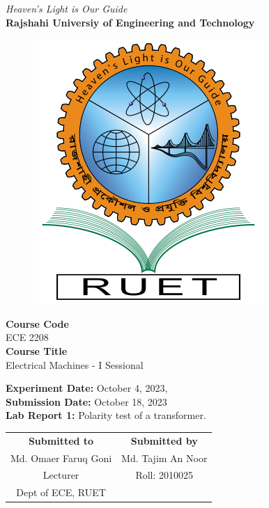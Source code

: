 \vspace*{\fill}
\begin{center}

    \emph{Heaven's Light is Our Guide} \\
    \textbf{Rajshahi Universiy of Engineering and Technology} \\

    \begin{figure}[h]
        \centering
        \includegraphics[scale=.34]{images/RUET_logo.png}
        \label{fig:ruet_logo}
    \end{figure}
    \vspace{5mm}

    \textbf{Course Code}\\
    ECE 2208\\
    \vspace{3mm}
    \textbf{Course Title}\\
    Electrical Machines - I Sessional

    \vspace{5mm}
    \textbf{Experiment Date:} {October 4, 2023,}\\
    \textbf{Submission Date:} {October 18, 2023}\\

    \vspace{5mm}
    \textbf{Lab Report 1:} Polarity test of a transformer.\\

    \vspace{15mm}

    \begin{tabular}{c|c}
        \textbf{Submitted to} & \textbf{Submitted by} \\
        Md. Omaer Faruq Goni  & Md. Tajim An Noor     \\
        Lecturer              & Roll: 2010025         \\
        Dept of ECE, RUET     &                       \\
    \end{tabular}

\end{center}
\vspace*{\fill}

